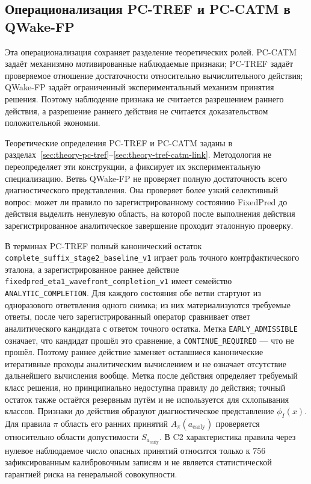 \subsection{Операционализация PC-TREF и PC-CATM в QWake-FP}
\label{sec:method-task-relative-sufficiency}

Эта операционализация сохраняет разделение теоретических ролей. PC-CATM задаёт
механизмно мотивированные наблюдаемые признаки; PC-TREF задаёт проверяемое
отношение достаточности относительно вычислительного действия; QWake-FP задаёт
ограниченный экспериментальный механизм принятия решения. Поэтому наблюдение
признака не считается разрешением раннего действия, а разрешение раннего
действия не считается доказательством положительной экономии.

Теоретические определения PC-TREF и PC-CATM заданы в
разделах~\ref{sec:theory-pc-tref}--\ref{sec:theory-tref-catm-link}. Методология
не переопределяет эти конструкции, а фиксирует их экспериментальную
специализацию. Ветвь QWake-FP не проверяет полную достаточность всего
диагностического представления. Она проверяет более узкий селективный вопрос:
может ли правило по зарегистрированному состоянию FixedPred до действия
выделить ненулевую область, на которой после выполнения действия
зарегистрированное аналитическое завершение проходит эталонную проверку.

В терминах PC-TREF полный канонический остаток
\nolinkurl{complete_suffix_stage2_baseline_v1} играет роль точного
контрфактического эталона, а зарегистрированное раннее действие
\nolinkurl{fixedpred_eta1_wavefront_completion_v1} имеет семейство
\texttt{ANALYTIC\_COMPLETION}. Для каждого состояния обе ветви стартуют из
одноразового ответвления одного снимка; из них материализуются требуемые ответы,
после чего зарегистрированный оператор сравнивает ответ аналитического кандидата
с ответом точного остатка. Метка \texttt{EARLY\_ADMISSIBLE} означает, что
кандидат прошёл это сравнение, а \texttt{CONTINUE\_REQUIRED} --- что не
прошёл. Поэтому раннее действие заменяет оставшиеся канонические итеративные
проходы аналитическим вычислением и не означает отсутствие дальнейшего
вычисления вообще. Метка после действия определяет требуемый класс решения, но
принципиально недоступна правилу до действия; точный остаток также остаётся
резервным путём и не используется для схлопывания классов. Признаки до действия образуют диагностическое представление
$\phi_I(x)$. Для правила $\pi$ область его ранних принятий
$A_{\pi}(a_{\mathrm{early}})$ проверяется относительно области допустимости
$S_{a_{\mathrm{early}}}$. В C2 характеристика правила через нулевое
наблюдаемое число опасных принятий относится только к 756 зафиксированным
калибровочным записям и не является статистической гарантией риска на
генеральной совокупности.

